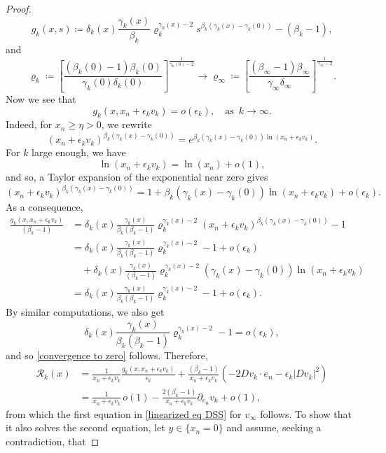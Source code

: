 \documentclass[reqno,11pt]{amsart}
\newcommand{\1}{\mathds{1}}
\numberwithin{equation}{section}
\begin{document}
\begin{proof}
$$    g_k(x,s) \coloneqq \delta_k(x)\frac{\gamma_k(x)}{\beta_k}\varrho_k^{\gamma_k(x)-2}s^{\beta_k(\gamma_k(x)-\gamma_k(0))} - (\beta_k-1),
$$
and
$$
    \varrho_k \coloneqq \left[\frac{(\beta_k(0)-1)\beta_k(0)}{\gamma_k(0) \delta_k(0)} \right]^{\frac{1}{\gamma_k(0) - 2}} \longrightarrow \varrho_\infty \coloneqq \left[\frac{(\beta_\infty-1)\beta_\infty}{\gamma_\infty \delta_\infty} \right]^{\frac{1}{\gamma_\infty - 2}}.
$$
Now we see that
\begin{equation}\label{convergence to zero}
    g_k\left(x,x_n + \epsilon_k v_k\right) = o(\epsilon_k), \quad \text{as }\, k \to \infty.
\end{equation}
Indeed, for $x_n \geq \eta > 0$, we rewrite
$$
    (x_n + \epsilon_k v_k)^{\beta_k(\gamma_k(x)-\gamma_k(0))} = e^{\beta_k(\gamma_k(x)-\gamma_k(0))\ln(x_n + \epsilon_k v_k)}.
$$
For $k$ large enough, we have
$$
    \ln(x_n + \epsilon_k v_k) = \ln(x_n) + o(1),
$$
and so, a Taylor expansion of the exponential near zero gives
$$
    (x_n + \epsilon_k v_k)^{\beta_k(\gamma_k(x)-\gamma_k(0))} = 1 + \beta_k(\gamma_k(x)-\gamma_k(0))\ln(x_n + \epsilon_k v_k) + o(\epsilon_k).
$$
As a consequence,
\begin{align*}
    \frac{g_k(x,x_n + \epsilon_k v_k)}{(\beta_k-1)} & =  \delta_k(x)\frac{\gamma_k(x)}{\beta_k(\beta_k -1)}\varrho_k^{\gamma_k(x)-2}(x_n + \epsilon_k v_k)^{\beta_k(\gamma_k(x)-\gamma_k(0))} - 1\\
    & =  \delta_k(x)\frac{\gamma_k(x)}{\beta_k(\beta_k -1)}\varrho_k^{\gamma_k(x)-2} - 1 + o(\epsilon_k)\\
    & \quad + \delta_k(x)\frac{\gamma_k(x)}{(\beta_k -1)}\varrho_k^{\gamma_k(x)-2}(\gamma_k(x)-\gamma_k(0))\ln(x_n + \epsilon_k v_k) \\
    & = \delta_k(x)\frac{\gamma_k(x)}{\beta_k(\beta_k -1)}\varrho_k^{\gamma_k(x)-2} - 1 + o(\epsilon_k).
\end{align*}
By similar computations, we also get
$$
    \delta_k(x)\frac{\gamma_k(x)}{\beta_k(\beta_k -1)}\varrho_k^{\gamma_k(x)-2} - 1 = o(\epsilon_k),
$$
and so \eqref{convergence to zero} follows. Therefore,
\begin{align*}
    \mathcal{R}_k(x) & =  \frac{1}{x_n + \epsilon_k v_k}\frac{g_k(x,x_n + \epsilon_kv_k)}{\epsilon_k}+ \frac{(\beta_k-1)}{x_n + \epsilon_k v_k}(- 2Dv_k \cdot e_n - \epsilon_k |Dv_k|^2)\\
    & =  \frac{1}{x_n + \epsilon_k v_k}\,o(1) - \frac{2(\beta_k-1)}{x_n + \epsilon_k v_k} \partial_{e_n}v_k + o(1),
\end{align*}
from which the first equation in \eqref{linearized eq DSS} for $v_\infty$ follows. To show that it also solves the second equation, let $y \in \{x_n =0\}$ and assume, seeking a contradiction, that

\end{proof}
\end{document}
